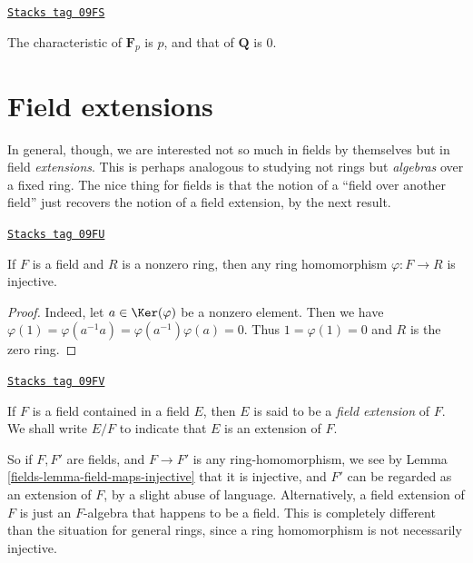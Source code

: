 \begin{example}[Characteristic]
\label{fields-example-characteristic}
\href{https://stacks.math.columbia.edu/tag/09FS}{\texttt{Stacks tag 09FS}}

The characteristic of $\mathbf{F}_p$ is $p$, and that of $\mathbf{Q}$ is $0$.
\end{example}

\section{Field extensions}
\label{fields-section-extensions}
In general, though, we are interested not so much in fields by themselves but
in field {\it extensions}. This is perhaps analogous to studying not rings
but {\it algebras} over a fixed ring.
The nice thing for fields is that the notion of a ``field over another field''
just recovers the notion of a field extension, by the next result.

\begin{lemma}
\label{fields-lemma-field-maps-injective}
\href{https://stacks.math.columbia.edu/tag/09FU}{\texttt{Stacks tag 09FU}}

If $F$ is a field and $R$ is a nonzero ring, then any ring homomorphism
$\varphi : F \to R$ is injective.
\end{lemma}

\begin{proof}
Indeed, let $a \in \Ker(\varphi)$ be a nonzero element. Then we have
$\varphi(1) = \varphi(a^{-1} a) = \varphi(a^{-1}) \varphi(a) = 0$.
Thus $1 = \varphi(1) = 0$ and $R$ is the zero ring.
\end{proof}

\begin{definition}[Extension]
\label{fields-definition-extension}
\href{https://stacks.math.columbia.edu/tag/09FV}{\texttt{Stacks tag 09FV}}

If $F$ is a field contained in a field $E$, then $E$ is said
to be a {\it field extension} of $F$. We shall write $E/F$ to indicate
that $E$ is an extension of $F$.
\end{definition}

So if $F, F'$ are fields, and $F \to F'$ is any ring-homomorphism, we see by
Lemma \ref{fields-lemma-field-maps-injective} that it is injective, and $F'$ can be
regarded as an extension of $F$, by a slight abuse of language. Alternatively,
a field extension of $F$ is just an $F$-algebra that happens to be a field.
This is completely different than the situation for general rings, since a
ring homomorphism is not necessarily injective.


